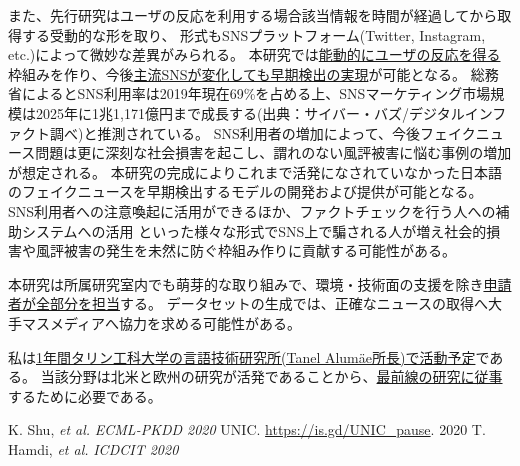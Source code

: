 また、先行研究はユーザの反応を利用する場合該当情報を時間が経過してから取得する受動的な形を取り、
形式もSNSプラットフォーム(Twitter, Instagram, etc.)によって微妙な差異がみられる。
本研究では\underline{能動的にユーザの反応を得る}枠組みを作り、今後\underline{主流SNSが変化しても早期検出の実現}が可能となる。
総務省によるとSNS利用率は2019年現在69\%を占める上、SNSマーケティング市場規模は2025年に1兆1,171億円まで成長する(出典：サイバー・バズ/デジタルインファクト調べ)と推測されている。
SNS利用者の増加によって、今後フェイクニュース問題は更に深刻な社会損害を起こし、謂れのない風評被害に悩む事例の増加が想定される。
本研究の完成によりこれまで活発になされていなかった日本語のフェイクニュースを早期検出するモデルの開発および提供が可能となる。
SNS利用者への注意喚起に活用ができるほか、ファクトチェックを行う人への補助システムへの活用
といった様々な形式でSNS上で騙される人が増え社会的損害や風評被害の発生を未然に防ぐ枠組み作りに貢献する可能性がある。


本研究は所属研究室内でも萌芽的な取り組みで、環境・技術面の支援を除き\underline{申請者が全部分を担当}する。
データセットの生成では、正確なニュースの取得へ大手マスメディアへ協力を求める可能性がある。

私は\underline{1年間タリン工科大学の言語技術研究所(Tanel Alumäe所長)で活動予定}である。
当該分野は北米と欧州の研究が活発であることから、\underline{最前線の研究に従事}するために必要である。

{\footnotesize 
\begin{twobibliography}{99}
    \setlength{\parskip}{0cm}
    \setlength{\itemsep}{0cm}
     K. Shu, \textit{et al.} \textit{ECML-PKDD 2020}
     UNIC. \url{https://is.gd/UNIC_pause}. 2020
     T. Hamdi, \textit{et al.} \textit{ICDCIT 2020}
\end{twobibliography}
}


